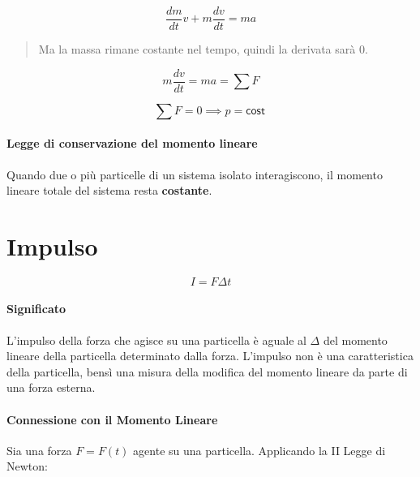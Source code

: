         \begin{equation*}
            \frac{dm}{dt} v + m \frac{dv}{dt} = ma
        \end{equation*}

        \begin{quote}
            Ma la massa rimane costante nel tempo, quindi la derivata sarà 0.
        \end{quote}

        \begin{equation*}
            m\frac{dv}{dt} = ma = \sum F
        \end{equation*}

        \begin{equation*}
            \sum F = 0 \implies p = \textsf{cost}\
        \end{equation*}

        \paragraph{Legge di conservazione del momento lineare} Quando due o più
        particelle di un sistema isolato interagiscono, il momento lineare 
        totale del sistema resta \textbf{costante}.


    \section{Impulso}

        \begin{equation}
            I = F \Delta t
        \end{equation}

        \paragraph{Significato} L'impulso della forza che agisce su una 
        particella è aguale al $\Delta$ del momento lineare della particella 
        determinato dalla forza. L'impulso non è una caratteristica della 
        particella, bensì una misura della modifica del momento lineare da parte
         di una forza esterna.

        \paragraph{Connessione con il Momento Lineare} Sia una forza $F = F(t)$
        agente su una particella. Applicando la II Legge di Newton:

